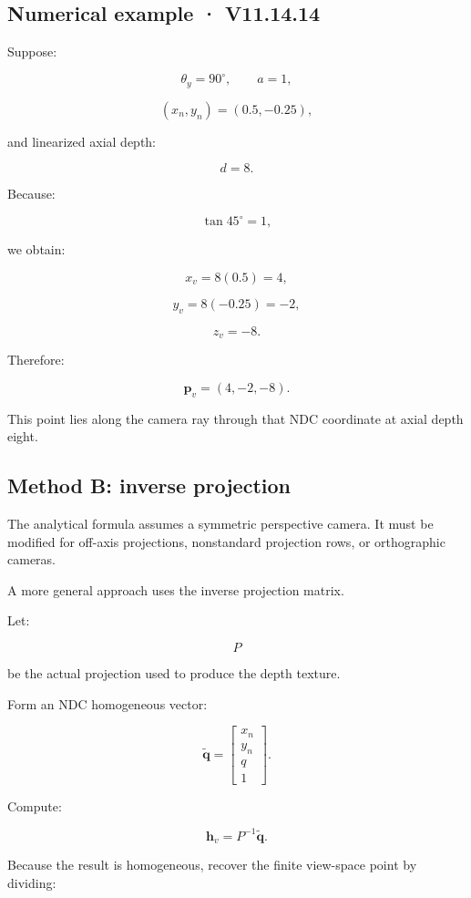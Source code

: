 \subsection{Numerical example · V11.14.14}\label{02-foundations-ii-ch035-numerical-example-v11.14.14}

Suppose:

\[ \theta_y=90^\circ,\qquad a=1, \]

\[ (x_n,y_n)=(0.5,-0.25), \]

and linearized axial depth:

\[ d=8. \]

Because:

\[ \tan45^\circ=1, \]

we obtain:

\[ x_v=8(0.5)=4, \]

\[ y_v=8(-0.25)=-2, \]

\[ z_v=-8. \]

Therefore:

\[ \boxed{\mathbf p_v=(4,-2,-8)}. \]

This point lies along the camera ray through that NDC coordinate at axial depth eight.

\subsection{Method B: inverse projection}\label{02-foundations-ii-ch035-method-b-inverse-projection}

The analytical formula assumes a symmetric perspective camera. It must be modified for off-axis projections, nonstandard projection rows, or orthographic cameras.

A more general approach uses the inverse projection matrix.

Let:

\[ P \]

be the actual projection used to produce the depth texture.

Form an NDC homogeneous vector:

\[ \tilde{\mathbf q}= \begin{bmatrix} x_n\\y_n\\q\\1 \end{bmatrix}. \]

Compute:

\[ \boxed{ \mathbf h_v=P^{-1}\tilde{\mathbf q}. } \]

Because the result is homogeneous, recover the finite view-space point by dividing:

